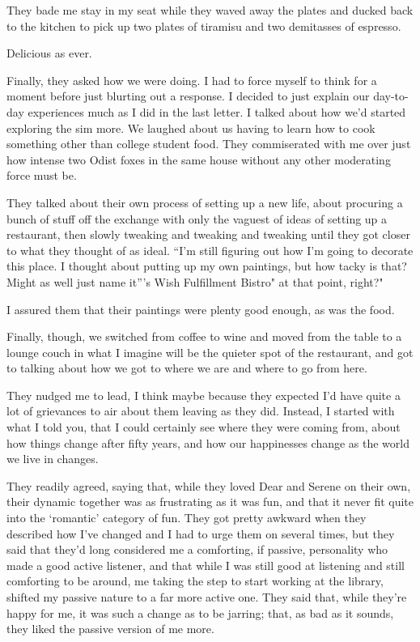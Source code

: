 They bade me stay in my seat while they waved away the plates and ducked back to the kitchen to pick up two plates of tiramisu and two demitasses of espresso.

Delicious as ever.

Finally, they asked how we were doing. I had to force myself to think for a moment before just blurting out a response. I decided to just explain our day-to-day experiences much as I did in the last letter. I talked about how we'd started exploring the sim more. We laughed about us having to learn how to cook something other than college student food. They commiserated with me over just how intense two Odist foxes in the same house without any other moderating force must be.

They talked about their own process of setting up a new life, about procuring a bunch of stuff off the exchange with only the vaguest of ideas of setting up a restaurant, then slowly tweaking and tweaking and tweaking until they got closer to what they thought of as ideal. ``I'm still figuring out how I'm going to decorate this place. I thought about putting up my own paintings, but how tacky is that? Might as well just name it''\Partner 's Wish Fulfillment Bistro" at that point, right?"

I assured them that their paintings were plenty good enough, as was the food.

Finally, though, we switched from coffee to wine and moved from the table to a lounge couch in what I imagine will be the quieter spot of the restaurant, and got to talking about how we got to where we are and where to go from here.

They nudged me to lead, I think maybe because they expected I'd have quite a lot of grievances to air about them leaving as they did. Instead, I started with what I told you, that I could certainly see where they were coming from, about how things change after fifty years, and how our happinesses change as the world we live in changes.

They readily agreed, saying that, while they loved Dear and Serene on their own, their dynamic together was as frustrating as it was fun, and that it never fit quite into the `romantic' category of fun. They got pretty awkward when they described how I've changed and I had to urge them on several times, but they said that they'd long considered me a comforting, if passive, personality who made a good active listener, and that while I was still good at listening and still comforting to be around, me taking the step to start working at the library, shifted my passive nature to a far more active one. They said that, while they're happy for me, it was such a change as to be jarring; that, as bad as it sounds, they liked the passive version of me more.

